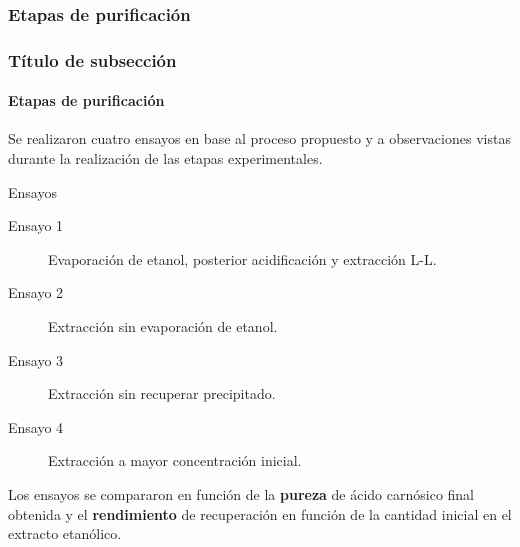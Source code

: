 \documentclass[aspectratio=1610]{beamer}
\newcommand{\ssec}{Título de subsección}
\begin{document}
\subsubsection{Etapas de purificación}
\begin{frame}
	\frametitle{\ssec}
	\framesubtitle{Etapas de purificación}
	Se realizaron cuatro ensayos en base al proceso propuesto y a observaciones vistas 
	durante la realización de las etapas experimentales.

	\begin{block}{Ensayos}
	\begin{description}
	\item[Ensayo 1] Evaporación de etanol, posterior acidificación y extracción L-L.
	\item[Ensayo 2] Extracción sin evaporación de etanol.
	\item[Ensayo 3] Extracción sin recuperar precipitado.
	\item[Ensayo 4] Extracción a mayor concentración inicial.
	\end{description}
	\end{block}
	Los ensayos se compararon en función de la \textbf{pureza} de ácido carnósico final obtenida y
	el \textbf{rendimiento} de recuperación en función de la cantidad inicial en el extracto etanólico.
\end{frame}
\end{document}
